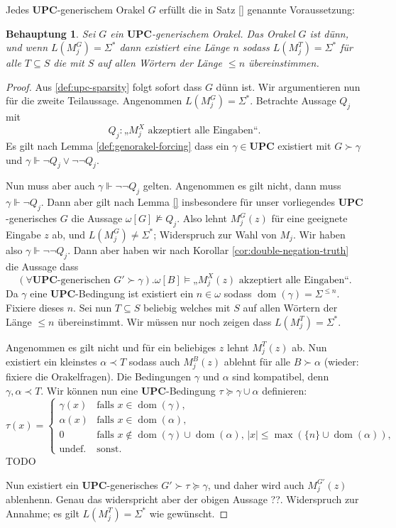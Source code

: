 \documentclass[nofonts]{uebung}
\newtheorem{claim}[theorem]{Behauptung}
\theoremstyle{definition}
\DeclareMathOperator{\dom}{dom}
\begin{document}
Jedes $\mathbf{UPC}$-generischem Orakel $G$ erfüllt die in Satz \ref{} genannte Voraussetzung:
\begin{claim}
    Sei $G$ ein $\mathbf{UPC}$-generischem Orakel.
    Das Orakel $G$ ist dünn, und wenn $L(M_j^G)=\Sigma^*$ dann existiert eine Länge $n$ sodass $L(M_j^T)=\Sigma^*$ für alle $T\subseteq S$ die mit $S$ auf allen Wörtern der Länge $\leq n$ übereinstimmen.
\end{claim}
\begin{proof}
    Aus \ref{def:upc-sparsity} folgt sofort dass $G$ dünn ist.
    Wir argumentieren nun für die zweite Teilaussage. Angenommen $L(M_j^G)=\Sigma^*$.
    Betrachte Aussage $Q_j$ mit
    \[ Q_j: \text{„$M_j^X$ akzeptiert alle Eingaben“}. \]
    Es gilt nach Lemma \ref{def:genorakel-forcing} dass ein $\gamma\in \mathbf{UPC}$ existiert mit $G\succ \gamma$ und $\gamma\Vdash \neg Q_j\lor \neg\neg Q_j$.

    Nun muss aber auch $\gamma\Vdash \neg\neg Q_j$ gelten. Angenommen es gilt nicht, dann muss $\gamma\Vdash \neg Q_j$.
    Dann aber gilt nach Lemma \ref{} insbesondere für unser vorliegendes $\mathbf{UPC}$-generisches $G$ die Aussage $\omega[G] \not\vDash Q_j$.
    Also lehnt $M_j^G(z)$ für eine geeignete Eingabe $z$ ab, und $L(M_j^G)\neq \Sigma^*$; Widerspruch zur Wahl von $M_j$.
    Wir haben also $\gamma\Vdash\neg\neg Q_j$. Dann aber haben wir nach Korollar \ref{cor:double-negation-truth} die Aussage dass
    \begin{equation} (\forall \text{$\mathbf{UPC}$-generischen $G'\succ \gamma$}). \omega[B] \vDash \text{„$M_j^X(z)$ akzeptiert alle Eingaben“}. \end{equation}
    Da $\gamma$ eine $\mathbf{UPC}$-Bedingung ist existiert ein $n\in\omega$ sodass $\dom(\gamma)=\Sigma^{\leq n}$. Fixiere dieses $n$.
    Sei nun $T\subseteq S$ beliebig welches mit $S$ auf allen Wörtern der Länge $\leq n$ übereinstimmt.
    Wir müssen nur noch zeigen dass $L(M_j^T)=\Sigma^*$.

    Angenommen es gilt nicht und für ein beliebiges $z$ lehnt $M_j^T(z)$ ab. Nun existiert ein kleinstes $\alpha\prec T$ sodass auch $M_j^B(z)$ ablehnt für alle $B\succ \alpha$ (wieder: fixiere die Orakelfragen).
    Die Bedingungen $\gamma$ und $\alpha$ sind kompatibel, denn $\gamma,\alpha\prec T$.
    Wir können nun eine $\mathbf{UPC}$-Bedingung $\tau\succeq \gamma\cup\alpha$ definieren: 
    \[ \tau(x)  =\begin{cases}
    \gamma(x) & \text{falls $x\in\dom(\gamma)$},\\
    \alpha(x) & \text{falls $x\in\dom(\alpha)$},\\
    0 & \text{falls $x\not\in\dom(\gamma)\cup\dom(\alpha)$, $|x|\leq \max(\{n\}\cup \dom(\alpha))$},\\
    \text{undef.} & \text{sonst}.
    \end{cases}
    \]
    TODO

    Nun existiert ein $\mathbf{UPC}$-generisches $G'\succ \tau\succeq \gamma$, und daher wird auch $M_j^{G'}(z)$ ablenhenn. Genau das widerspricht aber der obigen Aussage ??.
    Widerspruch zur Annahme; es gilt $L(M_j^T)=\Sigma^*$ wie gewünscht.
\end{proof}


\printbibliography[heading=subbibliography]

\endrefsection
\end{document}
